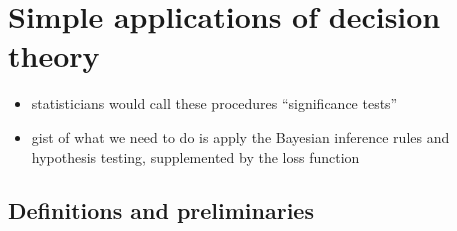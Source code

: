 \documentclass[../jaynes_prob_theory_notes.tex]{subfiles}
\begin{document}
    \section{Simple applications of decision theory}
        \begin{itemize} 
            \item statisticians would call these procedures ``significance tests''
            \item gist of what we need to do is apply the Bayesian inference rules and hypothesis testing, supplemented by the loss function
        \end{itemize}

        \subsection{Definitions and preliminaries}
\end{document}
